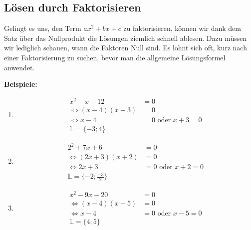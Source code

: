 \subsection{Lösen durch Faktorisieren}
Gelingt es uns, den Term $ax^2+bx+c$ zu faktorisieren, können wir dank dem Satz über das Nullprodukt die Lösungen ziemlich schnell ablesen. Dazu müssen wir lediglich schauen, wann die Faktoren Null sind. Es lohnt sich oft, kurz nach einer Faktorisierung zu suchen, bevor man die allgemeine Lösungsformel anwendet.


\begin{example}
	\textbf{Beispiele:}
	\begin{enumerate}[label=(\alph*)]
			\item 
			\begin{align*}
				x^2-x-12 &= 0 \\
				\Leftrightarrow (x-4)(x+3) &= 0 \\
				\Leftrightarrow x-4 &= 0 \text{ oder } x+3=0 \\
				\mathbb{L}=\{-3;4\} 
			\end{align*}
			\item 
			\begin{align*}
				2^2+7x+6 &= 0 \\
				\Leftrightarrow (2x+3)(x+2) &= 0 \\
				\Leftrightarrow 2x+3 &= 0 \text{ oder } x+2=0 \\
				\mathbb{L}=\{-2;\frac{-3}{2}\} 
			\end{align*}
			\item 
			\begin{align*}
				x^2-9x-20 &= 0 \\
				\Leftrightarrow (x-4)(x-5) &= 0 \\
				\Leftrightarrow x-4 &= 0 \text{ oder } x-5=0 \\
				\mathbb{L}=\{4;5\} 
			\end{align*}
	\end{enumerate}
\end{example}
